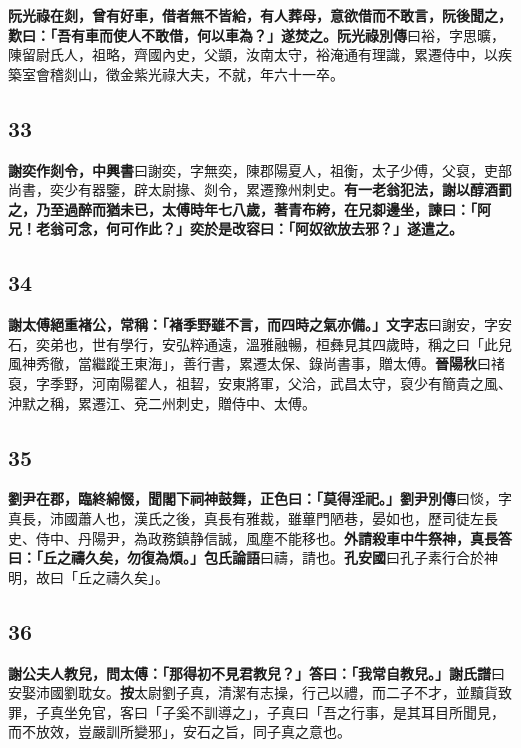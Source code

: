 \textbf{阮光祿在剡，曾有好車，借者無不皆給，有人葬母，意欲借而不敢言，阮後聞之，歎曰：「吾有車而使人不敢借，何以車為？」遂焚之。}{\footnotesize \textbf{阮光祿別傳}曰裕，字思曠，陳留尉氏人，祖略，齊國內史，父顗，汝南太守，裕淹通有理識，累遷侍中，以疾築室會稽剡山，徵金紫光祿大夫，不就，年六十一卒。}

\subsection*{33}

\textbf{謝奕作剡令，}{\footnotesize \textbf{中興書}曰謝奕，字無奕，陳郡陽夏人，祖衡，太子少傅，父裒，吏部尚書，奕少有器鑒，辟太尉掾、剡令，累遷豫州刺史。}\textbf{有一老翁犯法，謝以醇酒罰之，乃至過醉而猶未已，太傅時年七八歲，著青布絝，在兄厀邊坐，諫曰：「阿兄！老翁可念，何可作此？」奕於是改容曰：「阿奴欲放去邪？」遂遣之。}

\subsection*{34}

\textbf{謝太傅絕重褚公，常稱：「褚季野雖不言，而四時之氣亦備。」}{\footnotesize \textbf{文字志}曰謝安，字安石，奕弟也，世有學行，安弘粹通遠，溫雅融暢，桓彝見其四歲時，稱之曰「此兒風神秀徹，當繼蹤王東海」，善行書，累遷太保、錄尚書事，贈太傅。\textbf{晉陽秋}曰禇裒，字季野，河南陽翟人，祖䂮，安東將軍，父洽，武昌太守，裒少有簡貴之風、沖默之稱，累遷江、兗二州刺史，贈侍中、太傅。}

\subsection*{35}

\textbf{劉尹在郡，臨終綿惙，聞閣下祠神鼓舞，正色曰：「莫得淫祀。」}{\footnotesize \textbf{劉尹別傳}曰惔，字真長，沛國蕭人也，漢氏之後，真長有雅裁，雖蓽門陋巷，晏如也，歷司徒左長史、侍中、丹陽尹，為政務鎮静信誠，風塵不能移也。}\textbf{外請殺車中牛祭神，真長答曰：「丘之禱久矣，勿復為煩。」}{\footnotesize \textbf{包氏論語}曰禱，請也。\textbf{孔安國}曰孔子素行合於神明，故曰「丘之禱久矣」。}

\subsection*{36}

\textbf{謝公夫人教兒，問太傅：「那得初不見君教兒？」答曰：「我常自教兒。」}{\footnotesize \textbf{謝氏譜}曰安娶沛國劉耽女。\textbf{按}太尉劉子真，清潔有志操，行己以禮，而二子不才，並黷貨致罪，子真坐免官，客曰「子奚不訓導之」，子真曰「吾之行事，是其耳目所聞見，而不放效，豈嚴訓所變邪」，安石之旨，同子真之意也。}

